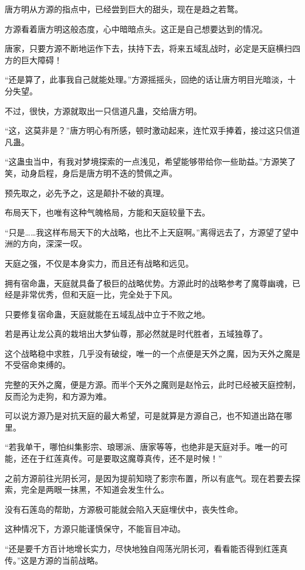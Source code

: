 \begin{this_body}
唐方明从方源的指点中，已经尝到巨大的甜头，现在是趋之若鹜。

方源看着唐方明这般态度，心中暗暗点头。这正是自己想要达到的情况。

唐家，只要方源不断地运作下去，扶持下去，将来五域乱战时，必定是天庭横扫四方的巨大障碍！

“还是算了，此事我自己就能处理。”方源摇摇头，回绝的话让唐方明目光暗淡，十分失望。

不过，很快，方源就取出一只信道凡蛊，交给唐方明。

“这，这莫非是？”唐方明心有所感，顿时激动起来，连忙双手捧着，接过这只信道凡蛊。

“这蛊虫当中，有我对梦境探索的一点浅见，希望能够带给你一些助益。”方源笑了笑，动身启程，身后是唐方明不迭的赞佩之声。

预先取之，必先予之，这是颠扑不破的真理。

布局天下，也唯有这种气魄格局，方能和天庭较量下去。

“只是……我这样布局天下的大战略，也比不上天庭啊。”离得远去了，方源望了望中洲的方向，深深一叹。

天庭之强，不仅是本身实力，而且还有战略和远见。

拥有宿命蛊，天庭就具备了极巨的战略优势。方源此时的战略参考了魔尊幽魂，已经是非常优秀，但和天庭一比，完全处于下风。

只要修复宿命蛊，天庭就能在五域乱战中立于不败之地。

若是再让龙公真的栽培出大梦仙尊，那必然就是时代胜者，五域独尊了。

这个战略稳中求胜，几乎没有破绽，唯一的一个点便是天外之魔，因为天外之魔是不受宿命束缚的。

完整的天外之魔，便是方源。而半个天外之魔则是赵怜云，此时已经被天庭控制，反而沦为走狗，和方源为难。

可以说方源乃是对抗天庭的最大希望，可是就算是方源自己，也不知道出路在哪里。

“若我单干，哪怕纠集影宗、琅琊派、唐家等等，也绝非是天庭对手。唯一的可能，还在于红莲真传。可是要取这魔尊真传，还不是时候！”

之前方源前往光阴长河，是因为提前知晓了影宗布置，所以有底气。现在若要去探索，完全是两眼一抹黑，不知道会发生什么。

没有石莲岛的帮助，方源极可能就会陷入天庭埋伏中，丧失性命。

这种情况下，方源只能谨慎保守，不能盲目冲动。

“还是要千方百计地增长实力，尽快地独自闯荡光阴长河，看看能否得到红莲真传。”这是方源的当前战略。


\end{this_body}

